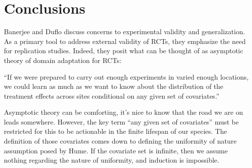 \documentclass[a4paper,12pt]{article}
\begin{document}












\section{Conclusions}

Banerjee and Duflo \parencite*{Banerjee2014} discuss concerns to experimental validity and generalization. As a primary tool to address external validity of RCTs, they emphasize the need for replication studies. Indeed, they posit what can be thought of as asymptotic theory of domain adaptation for RCTs:

\begin{displayquote}
``If we were prepared to carry out enough experiments in varied enough locations, we could learn as much as we want to know about the distribution of the treatment effects across sites conditional on any given set of covariates.''
\end{displayquote}

Asymptotic theory can be comforting, it's nice to know that the road we are on leads somewhere. However, the key term ``any given set of covariates'' must be restricted for this to be actionable in the finite lifespan of our species. The definition of those covariates comes down to defining the uniformity of nature assumption posed by Hume. If the covariate set is infinite, then we assume nothing regarding the nature of uniformity, and induction is impossible.
\end{document}
